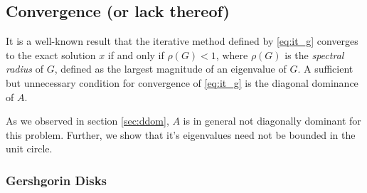 \documentclass[10pt]{article}
\begin{document}
\begin{multicols}{2}



\subsection{Convergence (or lack thereof)}

It is a well-known result \citep{anderson_analysis_2012} that the iterative method defined by \eqref{eq:it_g} converges to the exact solution $x$ if and only if $\rho(G) < 1$, where $\rho(G)$ is the \textit{spectral radius} of $G$, defined as the largest magnitude of an eigenvalue of $G$.
A sufficient but unnecessary condition for convergence of \eqref{eq:it_g} is the diagonal dominance of $A$.

As we observed in section \ref{sec:ddom}, $A$ is in general not diagonally dominant for this problem.
Further, we show that it's eigenvalues need not be bounded in the unit circle.

\subsubsection{Gershgorin Disks}


% 


\end{multicols}
\end{document}
